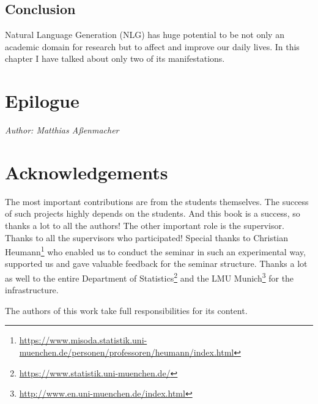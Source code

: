 \documentclass[]{krantz}
\renewcommand{\href}[2]{#2\footnote{\url{#1}}}
\begin{document}
\hypertarget{conclusion}{%
\section{Conclusion}\label{conclusion}}

Natural Language Generation (NLG) has huge potential to be not only an academic domain for research but to affect and improve our daily lives. In this chapter I have talked about only two of its manifestations.

\hypertarget{epilogue}{%
\chapter{Epilogue}\label{epilogue}}

\emph{Author: Matthias Aßenmacher}

\hypertarget{acknowledgements}{%
\chapter{Acknowledgements}\label{acknowledgements}}

The most important contributions are from the students themselves.
The success of such projects highly depends on the students.
And this book is a success, so thanks a lot to all the authors!
The other important role is the supervisor.
Thanks to all the supervisors who participated!
Special thanks to \href{https://www.misoda.statistik.uni-muenchen.de/personen/professoren/heumann/index.html}{Christian Heumann} who enabled us to conduct the seminar in such an experimental way, supported us and gave valuable feedback for the seminar structure.
Thanks a lot as well to the entire \href{https://www.statistik.uni-muenchen.de/}{Department of Statistics} and the \href{http://www.en.uni-muenchen.de/index.html}{LMU Munich} for the infrastructure.

The authors of this work take full responsibilities for its content.



\backmatter
\printindex
\end{document}
